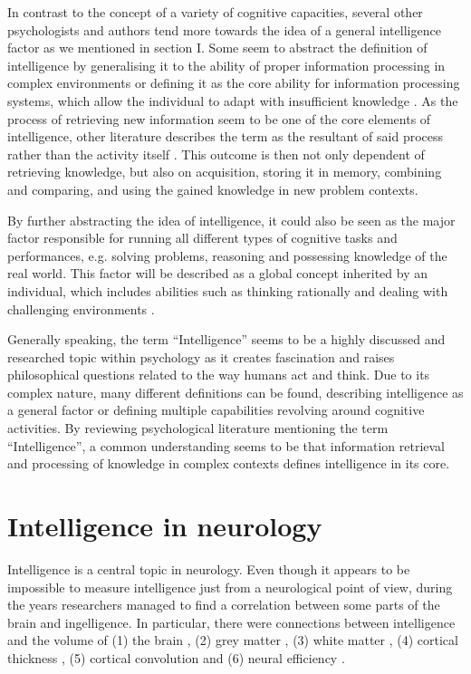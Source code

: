 \documentclass[conference]{IEEEtran}
\begin{document}
	In contrast to the concept of a variety of cognitive capacities, several other psychologists and authors tend more towards the idea of a general intelligence factor as we mentioned in section I. Some seem to abstract the definition of intelligence by generalising it to the ability of proper information processing in complex environments \cite{b5} or defining it as the core ability for information processing systems, which allow the individual to adapt with insufficient knowledge \cite{b6}. As the process of retrieving new information seem to be one of the core elements of intelligence, other literature describes the term as the resultant of said process rather than the activity itself \cite{b4}. This outcome is then not only dependent of retrieving knowledge, but also on acquisition, storing it in memory, combining and comparing, and using the gained knowledge in new problem contexts.

	By further abstracting the idea of intelligence, it could also be seen as the major factor responsible for running all different types of cognitive tasks and performances, e.g. solving problems, reasoning and possessing knowledge of the real world. This factor will be described as a global concept inherited by an individual, which includes abilities such as thinking rationally and dealing with challenging environments \cite{b7}.

	Generally speaking, the term “Intelligence” seems to be a highly discussed and researched topic within psychology as it creates fascination and raises philosophical questions related to the way humans act and think. Due to its complex nature, many different definitions can be found, describing intelligence as a general factor or defining multiple capabilities revolving around cognitive activities. By reviewing psychological literature mentioning the term “Intelligence”, a common understanding seems to be that information retrieval and processing of knowledge in complex contexts defines intelligence in its core.

\section{Intelligence in neurology}

	Intelligence is a central topic in neurology. Even though it appears to be impossible to measure intelligence just from a neurological point of view, during the years researchers managed to find a correlation between some parts of the brain and ingelligence. In particular, there were connections between intelligence and the volume of (1) the brain \cite{c1}, (2) grey matter \cite{c2}, (3) white matter \cite{c3}, (4) cortical thickness \cite{c2}, (5) cortical convolution \cite{c5} and (6) neural efficiency \cite{c6}.
\end{document}
